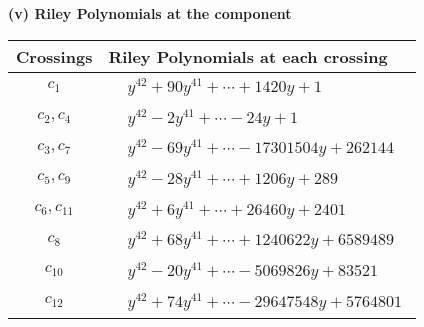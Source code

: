 \documentclass[1p]{elsarticle_modified}
\theoremstyle{definition}
\begin{document}
\newpage\renewcommand{\arraystretch}{1}
\flushleft \textbf{(v) Riley Polynomials at the component}\newline \\
\begin{tabular}{m{50pt}|m{274pt}}
Crossings & \hspace{64pt}Riley Polynomials at each crossing \\
\hline $$\begin{aligned}c_{1}\end{aligned}$$&$\begin{aligned}
&y^{42}+90 y^{41}+\cdots+1420 y+1
\end{aligned}$\\
\hline $$\begin{aligned}c_{2},c_{4}\end{aligned}$$&$\begin{aligned}
&y^{42}-2 y^{41}+\cdots-24 y+1
\end{aligned}$\\
\hline $$\begin{aligned}c_{3},c_{7}\end{aligned}$$&$\begin{aligned}
&y^{42}-69 y^{41}+\cdots-17301504 y+262144
\end{aligned}$\\
\hline $$\begin{aligned}c_{5},c_{9}\end{aligned}$$&$\begin{aligned}
&y^{42}-28 y^{41}+\cdots+1206 y+289
\end{aligned}$\\
\hline $$\begin{aligned}c_{6},c_{11}\end{aligned}$$&$\begin{aligned}
&y^{42}+6 y^{41}+\cdots+26460 y+2401
\end{aligned}$\\
\hline $$\begin{aligned}c_{8}\end{aligned}$$&$\begin{aligned}
&y^{42}+68 y^{41}+\cdots+1240622 y+6589489
\end{aligned}$\\
\hline $$\begin{aligned}c_{10}\end{aligned}$$&$\begin{aligned}
&y^{42}-20 y^{41}+\cdots-5069826 y+83521
\end{aligned}$\\
\hline $$\begin{aligned}c_{12}\end{aligned}$$&$\begin{aligned}
&y^{42}+74 y^{41}+\cdots-29647548 y+5764801
\end{aligned}$\\
\hline
\end{tabular}\\~\\
\end{document}
